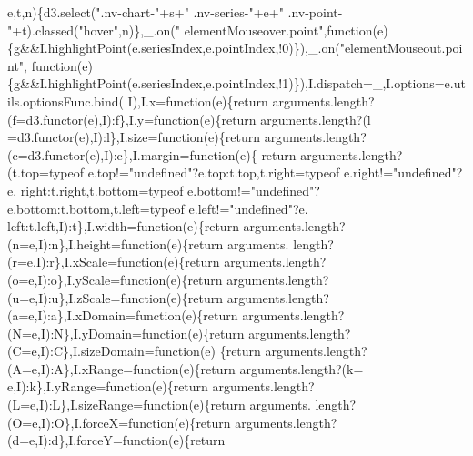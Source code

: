 \begin{DoxyCode}
      e,t,n)\{d3.select(\textcolor{stringliteral}{".nv-chart-"}+s+\textcolor{stringliteral}{" .nv-series-"}+e+\textcolor{stringliteral}{" .nv-point-"}+t).classed(\textcolor{stringliteral}{"hover"},n)\},\_.on(\textcolor{stringliteral}{"
      elementMouseover.point"},\textcolor{keyword}{function}(e)\{g&&I.highlightPoint(e.seriesIndex,e.pointIndex,!0)\}),\_.on(\textcolor{stringliteral}{"elementMouseout.point"},\textcolor{keyword}{
      function}(e)\{g&&I.highlightPoint(e.seriesIndex,e.pointIndex,!1)\}),I.dispatch=\_,I.options=e.utils.optionsFunc.bind(
      I),I.x=\textcolor{keyword}{function}(e)\{\textcolor{keywordflow}{return} arguments.length?(f=d3.functor(e),I):f\},I.y=\textcolor{keyword}{function}(e)\{\textcolor{keywordflow}{return} arguments.length?(l
      =d3.functor(e),I):l\},I.size=\textcolor{keyword}{function}(e)\{\textcolor{keywordflow}{return} arguments.length?(c=d3.functor(e),I):c\},I.margin=\textcolor{keyword}{function}(e)\{\textcolor{keywordflow}{
      return} arguments.length?(t.top=typeof e.top!=\textcolor{stringliteral}{"undefined"}?e.top:t.top,t.right=typeof e.right!=\textcolor{stringliteral}{"undefined"}?e.
      right:t.right,t.bottom=typeof e.bottom!=\textcolor{stringliteral}{"undefined"}?e.bottom:t.bottom,t.left=typeof e.left!=\textcolor{stringliteral}{"undefined"}?e.
      left:t.left,I):t\},I.width=\textcolor{keyword}{function}(e)\{\textcolor{keywordflow}{return} arguments.length?(n=e,I):n\},I.height=\textcolor{keyword}{function}(e)\{\textcolor{keywordflow}{return} arguments.
      length?(r=e,I):r\},I.xScale=\textcolor{keyword}{function}(e)\{\textcolor{keywordflow}{return} arguments.length?(o=e,I):o\},I.yScale=\textcolor{keyword}{function}(e)\{\textcolor{keywordflow}{return} 
      arguments.length?(u=e,I):u\},I.zScale=\textcolor{keyword}{function}(e)\{\textcolor{keywordflow}{return} arguments.length?(a=e,I):a\},I.xDomain=\textcolor{keyword}{function}(e)\{\textcolor{keywordflow}{return} 
      arguments.length?(N=e,I):N\},I.yDomain=\textcolor{keyword}{function}(e)\{\textcolor{keywordflow}{return} arguments.length?(C=e,I):C\},I.sizeDomain=\textcolor{keyword}{function}(e)
      \{\textcolor{keywordflow}{return} arguments.length?(A=e,I):A\},I.xRange=\textcolor{keyword}{function}(e)\{\textcolor{keywordflow}{return} arguments.length?(k=
      e,I):k\},I.yRange=\textcolor{keyword}{function}(e)\{\textcolor{keywordflow}{return} arguments.length?(L=e,I):L\},I.sizeRange=\textcolor{keyword}{function}(e)\{\textcolor{keywordflow}{return} arguments.
      length?(O=e,I):O\},I.forceX=\textcolor{keyword}{function}(e)\{\textcolor{keywordflow}{return} arguments.length?(d=e,I):d\},I.forceY=\textcolor{keyword}{function}(e)\{\textcolor{keywordflow}{return} 

\end{DoxyCode}
